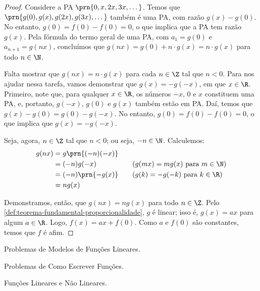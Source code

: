 \begin{proof}
    Considere a PA $\prn{0, x, 2x, 3x, \dots}$. Temos que $\prn{g(0), g(x), g(2x), g(3x), \dots}$
    também é uma PA, com razão $g(x)-g(0)$. No entanto, $g(0) = f(0)-f(0) = 0$, o que implica que a PA tem
    razão $g(x)$. Pela fórmula do termo geral de uma PA, com $a_1 = g(0)$ e $a_{n+1} = g(nx)$,
    concluímos que $g(nx) = g(0) + n\cdot g(x) = n\cdot g(x)$
    para todo $n \in \N$.

    Falta mostrar que $g(nx) = n \cdot g(x)$ para cada $n \in \Z$ tal que $n < 0$.
    Para nos ajudar nessa tarefa, vamos demonstrar que $g(x) = -g(-x)$, em que $x \in \R$. 
    Primeiro, note que, para qualquer $x \in \R$, os números $-x$, $0$ e $x$
    constituem uma PA, e, portanto, $g(-x)$, $g(0)$ e $g(x)$ também estão em PA. Daí, temos que $g(x) - g(0) = 
    g(0)-g(-x)$. No entanto, $g(0) = f(0) - f(0) = 0$, o que implica que $g(x) = -g(-x)$.

    Seja, agora, $n \in \Z$ tal que $n < 0$; ou seja, $-n \in \N$. Calculemos:
    \begin{alignat*}{3}
        g(nx) &= g\prn{(-n)(-x)} &&  \\
        &= (-n)g(-x) && \quad\text{($g(mx) = mg(x)$ para $m\in\N$)} \\
        &= (-n)\prn{-g(x)} && \quad\text{($g(k) = -g(-k)$ para $k \in \R$)} \\
        &= ng(x)
    \end{alignat*}

    Demonstramos, então, que $g(nx) = ng(x)$ para todo $n \in \Z$. Pelo \ref{def:teorema-fundamental-proporcionalidade},
    $g$ é linear; isso é, $g(x) = ax$ para algum $a \in \R$. Logo, $f(x) = ax + f(0)$. Como $a$ e $f(0)$ são constantes,
    temos que $f$ é afim.

    
 \end{proof}

\begin{onlineact}
    {Problemas de Modelos de Funções Lineares}.
\end{onlineact}

\begin{onlineact}
    {Problemas de Como Escrever Funções}.
\end{onlineact}

\begin{onlineact}
    {Funções Lineares e Não Lineares}.
\end{onlineact}